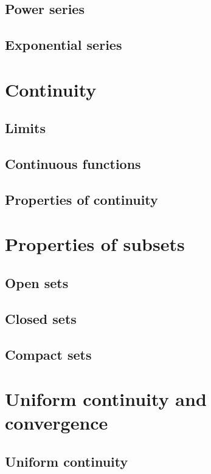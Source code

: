 \subsection{Power series}

\subsection{Exponential series}

\section{Continuity}

\subsection{Limits}

\subsection{Continuous functions}

\subsection{Properties of continuity}

\section{Properties of subsets}

\subsection{Open sets}

\subsection{Closed sets}

\subsection{Compact sets}

\section{Uniform continuity and convergence}

\subsection{Uniform continuity}

